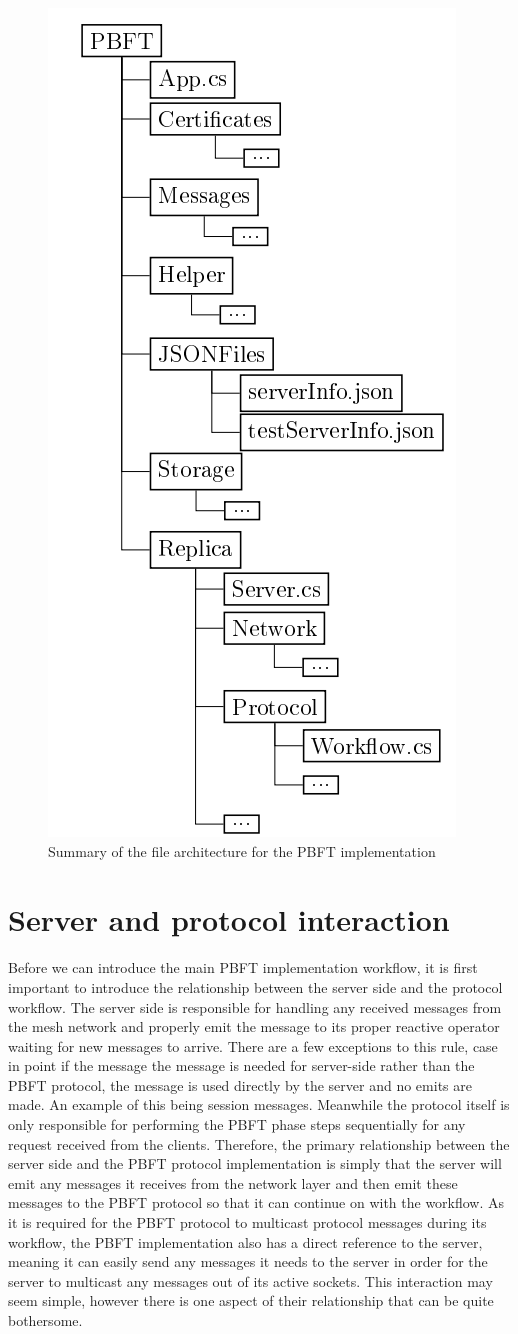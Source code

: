 \begin{figure}[H]
	\includegraphics[width=0.45\linewidth]{figures/filestructtest}
	\caption{Summary of the file architecture for the PBFT implementation}
    \label{fig:filestruct}
\end{figure}

\newpage

\section{Server and protocol interaction}
Before we can introduce the main PBFT implementation workflow, it is first important to introduce the relationship between the server side and the protocol workflow. The server side is responsible for handling any received messages from the mesh network and properly emit the message to its proper reactive operator waiting for new messages to arrive. There are a few exceptions to this rule, case in point if the message the message is needed for server-side rather than the PBFT protocol, the message is used directly by the server and no emits are made. An example of this being session messages. Meanwhile the protocol itself is only responsible for performing the PBFT phase steps sequentially for any request received from the clients. Therefore, the primary relationship between the server side and the PBFT protocol implementation is simply that the server will emit any messages it receives from the network layer and then emit these messages to the PBFT protocol so that it can continue on with the workflow. As it is required for the PBFT protocol to multicast protocol messages during its workflow, the PBFT implementation also has a direct reference to the server, meaning it can easily send any messages it needs to the server in order for the server to multicast any messages out of its active sockets. This interaction may seem simple, however there is one aspect of their relationship that can be quite bothersome. 

